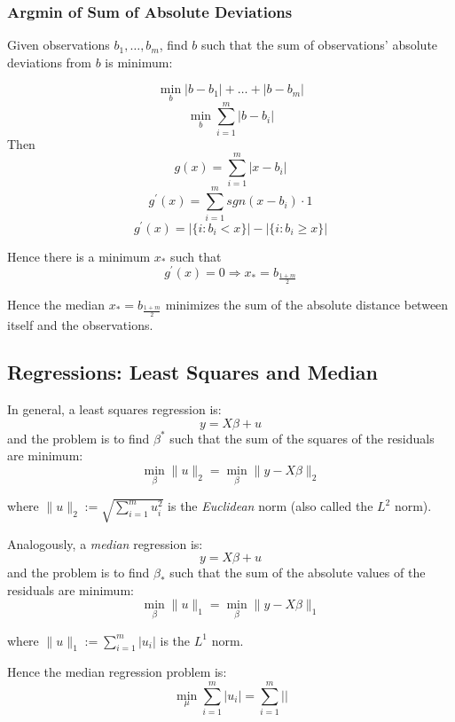\documentclass[11pt,]{article}
\begin{document}
\subsubsection{Argmin of Sum of Absolute
Deviations}\label{argmin-of-sum-of-absolute-deviations}

Given observations \(b_1,\hdots,b_m\), find \(b\) such that the sum of
observations' absolute deviations from \(b\) is minimum:

\[\min_b{} |b-b_1|+\hdots+|b-b_m|\] \[\min_b{} \sum_{i=1}^m |b-b_i|\]
Then \[g(x) = \sum_{i=1}^m |x-b_i|\]
\[g^{\prime}(x) = \sum_{i=1}^m sgn(x-b_i)\cdot 1\]
\[g^{\prime}(x) = |\{i: b_i < x\}| - |\{i: b_i \geq x\}| \]

Hence there is a minimum \(x_*\) such that
\[g^{\prime}(x) =  0 \Rightarrow x_* = b_{\frac{1+m}{2}}\]

Hence the median \(x_* = b_{\frac{1+m}{2}}\) minimizes the sum of the
absolute distance between itself and the observations.

\subsection{Regressions: Least Squares and
Median}\label{regressions-least-squares-and-median}

In general, a least squares regression is: \[y = X\beta+u\] and the
problem is to find \(\beta^*\) such that the sum of the squares of the
residuals are minimum:
\[\min_{\beta}{} \|u\|_2=\min_{\beta}{}\|y-X\beta\|_2\]

where \(\|u\|_2 := \sqrt{\sum_{i=1}^m u_i^2}\) is the \emph{Euclidean}
norm (also called the \(L^2\) norm).

Analogously, a \emph{median} regression is: \[y = X\beta+u\] and the
problem is to find \(\beta_*\) such that the sum of the absolute values
of the residuals are minimum:
\[\min_{\beta}{} \|u\|_1=\min_{\beta}{}\|y-X\beta\|_1\]

where \(\|u\|_1 := \sum_{i=1}^m |u_i|\) is the \(L^1\) norm.

Hence the median regression problem is:
\[\min_{\mu}{} \sum_{i=1}^m |u_i|=\sum_{i=1}^m ||\]
\end{document}
